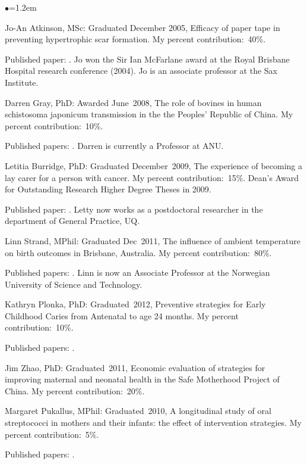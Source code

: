 \documentclass[a4paper,11pt]{article}
\renewcommand{\labelitemi}{$\bullet$}
\begin{document}
\begin{raggedright}
\begin{list}{\labelitemi}{\leftmargin=1.2em}
\item Jo-An Atkinson, MSc: Graduated December 2005, Efficacy of paper tape in preventing hypertrophic scar formation. My percent contribution:~40\%.

Published paper: . Jo won the Sir Ian McFarlane award at the Royal Brisbane Hospital research conference (2004). Jo is an associate professor at the Sax Institute.

\item Darren Gray, PhD: Awarded June~2008, The role of bovines in human schistosoma japonicum transmission in the the Peoples' Republic of China. My percent contribution:~10\%.

Published papers: . Darren is currently a Professor at ANU.

\item Letitia Burridge, PhD: Graduated December~2009, The experience of becoming a lay carer for a person with cancer. My percent contribution:~15\%. Dean's Award for Outstanding Research Higher Degree Theses in 2009.

Published paper: . Letty now works as a postdoctoral researcher in the department of General Practice, UQ.

\item Linn Strand, MPhil: Graduated Dec~2011, The influence of ambient temperature on birth outcomes in Brisbane, Australia. My percent contribution:~80\%.

Published papers: . Linn is now an Associate Professor at the Norwegian University of Science and Technology.

\item Kathryn Plonka, PhD: Graduated~2012, Preventive strategies for Early Childhood Caries from Antenatal to age 24 months. My percent contribution:~10\%.

Published papers: . 

\item Jim Zhao, PhD: Graduated~2011, Economic evaluation of strategies for improving maternal and neonatal health in the Safe Motherhood Project of China. My percent contribution:~20\%.

\item Margaret Pukallus, MPhil: Graduated~2010, A longitudinal study of oral streptococci in mothers and their infants: the effect of intervention strategies. My percent contribution:~5\%.

Published papers: .


\end{list}
\end{raggedright}
\end{document}
